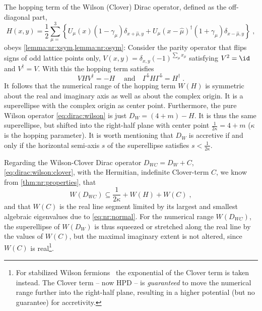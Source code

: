 The hopping term of the Wilson (Clover) Dirac operator, defined as the off-diagonal part,
\begin{equation}
H(x,y) = \frac{1}{2} \sum_{\mu=}^{3}
\left\{
      U_{\mu}(x) (1 - \gamma_{\mu}) \delta_{x+\hat{\mu}, y}
    + U_{\mu}(x - \hat{\mu})^{\dagger} (1 + \gamma_{\mu}) \delta_{x-\hat{\mu}, y}
\right\} \;,
\end{equation}
obeys \cref{lemma:nr:xsym,lemma:nr:osym}:
Consider the parity operator that flips signs of odd lattice points only, $V(x,y) = \delta_{x,y} (-1)^{\sum_{\mu} x_{\mu}}$ satisfying $V^{2} = \id$ and $V^{\dagger} = V$.
With this the hopping term satisfies
\begin{equation}
V H V^{\dagger} = -H \;
\quad
\text{and}
\quad
\Gamma^{5} H \Gamma^{5} = H^{\dagger} \;.
\end{equation}
It follows that the numerical range of the hopping term $W(H)$ is symmetric about the real and imaginary axis as well as about the complex origin.
It is a superellipse with the complex origin as center point.
Furthermore, the pure Wilson operator \cref{eq:dirac:wilson} is just $D_W = (4+m) - H$.
It is thus the same superellipse, but shifted into the right-half plane with center point $\frac{1}{2 \kappa} = 4+m$ ($\kappa$ is the hopping parameter).
It is worth mentioning that $D_W$ is accretive if and only if the horizontal semi-axis $s$ of the superellipse satisfies $s < \frac{1}{2 \kappa}$.

Regarding the Wilson-Clover Dirac operator $D_{WC} = D_W + C$, \cref{eq:dirac:wilson:clover}, with the Hermitian,  indefinite Clover-term $C$, we know from \cref{thm:nr:properties}, that
\begin{equation}
W(D_{WC}) \subseteq  \frac{1}{2 \kappa} + W(H) + W(C) \;,
\end{equation}
and that $W(C)$ is the real line segment limited by its largest and smallest algebraic eigenvalues due to \cref{eq:nr:normal}.
For the numerical range $W(D_{WC})$, the superellipse of $W(D_{W})$ is thus squeezed or stretched along the real line by the values of $W(C)$, but the maximal imaginary extent is not altered, since $W(C)$ is real\footnote{For stabilized Wilson fermions~\cite{Francis:2019muy} the exponential of the Clover term is taken instead. The Clover term -- now HPD -- is \emph{guaranteed} to move the numerical range further into the right-half plane, resulting in a higher potential (but no guarantee) for accretivity.}.

